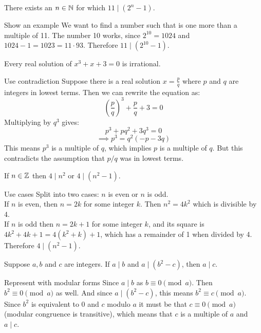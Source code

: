 \documentclass{article}
\begin{document}
\begin{problem}
There exists an $n \in \mathbb{N}$ for which $11 \mid (2^n - 1)$.
\end{problem}
\begin{solution}{Show an example}
  We want to find a number such that is one more than a multiple of 11. The number 10 works, since $2^{10} = 1024$ and $1024 - 1 = 1023 = 11\cdot 93$. Therefore $11 \mid (2^{10} - 1)$.
\end{solution}

\begin{problem}
Every real solution of $x^3 +x + 3 = 0$ is irrational.
\end{problem}
\begin{solution}{Use contradiction}
  Suppose there is a real solution $x = \frac{p}{q}$ where $p$ and $q$ are integers in lowest terms. Then we can rewrite the equation as:
  $$\left(\frac{p}{q}\right)^3 + \frac{p}{q} + 3 = 0$$
  Multiplying by $q^3$ gives:
  $$p^3 + pq^2 + 3q^3 = 0$$
  $$\implies p^3 = q^2(-p - 3q)$$
  This means $p^3$ is a multiple of $q$, which implies $p$ is a multiple of $q$. But this contradicts the assumption that $p/q$ was in lowest terms.
\end{solution}

\begin{problem}
If $ n \in \mathbb{Z}$ then $4 \mid n^2$ or $4 \mid (n^2 - 1)$.
\end{problem}
\begin{solution}{Use cases}
  Split into two cases: $n$ is even or $n$ is odd.
  \\

  If $n$ is even, then $n = 2k$ for some integer $k$. Then $n^2 = 4k^2$ which is divisible by 4.
  \\

  If $n$ is odd then $n = 2k + 1$ for some integer $k$, and its square is $4k^2 + 4k + 1 = 4(k^2 + k) + 1$, which has a remainder of 1 when divided by 4. Therefore $4 \mid (n^2 - 1)$.
\end{solution}

\begin{problem}
Suppose $a, b$ and $c$ are integers. If $a \mid b$ and $a \mid (b^2 - c)$, then $a \mid c$.
\end{problem}
\begin{solution}{Represent with modular forms}
  Since $a \mid b$ as $b \equiv 0 \pmod{a}$. Then $b^2 \equiv 0 \pmod{a}$ as well. And since $a \mid (b^2 - c)$, this means $b^2 \equiv c \pmod{a}$. Since $b^2$ is equivalent to 0 and $c$ modulo $a$ it must be that $c \equiv 0 \pmod{a}$ (modular congruence is transitive), which means that $c$ is a multiple of $a$ and $a \mid c$.
\end{solution}
\end{document}
